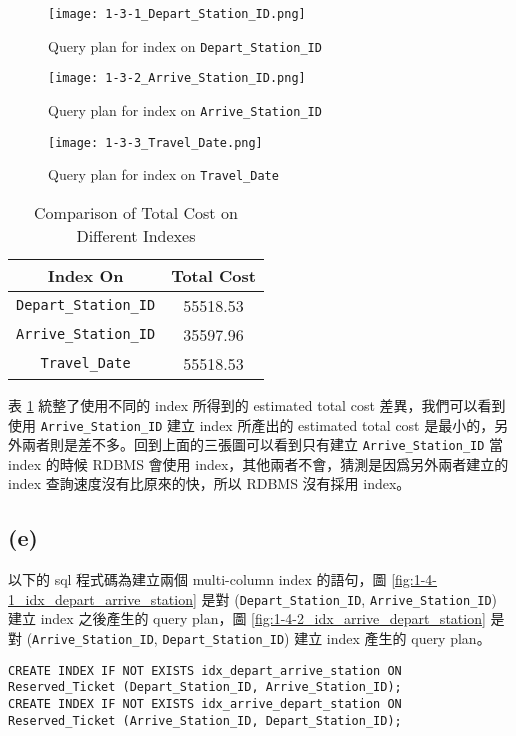 \documentclass{article}
\begin{document}
\begin{figure}[H]
    \centering
    \texttt{[image: 1-3-1\_Depart\_Station\_ID.png]}
    \caption{Query plan for index on \texttt{Depart\_Station\_ID}}
    \label{fig:1-3-1_Depart_Station_ID}
\end{figure}

\begin{figure}[H]
    \centering
    \texttt{[image: 1-3-2\_Arrive\_Station\_ID.png]}
    \caption{Query plan for index on \texttt{Arrive\_Station\_ID}}
    \label{fig:1-3-2_Arrive_Station_ID}
\end{figure}

\begin{figure}[H]
    \centering
    \texttt{[image: 1-3-3\_Travel\_Date.png]}
    \caption{Query plan for index on \texttt{Travel\_Date}}
    \label{fig:1-3-3_Travel_Date}
\end{figure}

\begin{table}[H]
    \centering
    \begin{tabular}{cc}
        \toprule
        \textbf{Index On} & \textbf{Total Cost} \\
        \midrule
        \texttt{Depart\_Station\_ID} & 55518.53 \\
        \texttt{Arrive\_Station\_ID} & 35597.96 \\
        \texttt{Travel\_Date} & 55518.53 \\
        \bottomrule
    \end{tabular}
    \caption{Comparison of Total Cost on Different Indexes}
    \label{tab:index-comparison}
\end{table}

表 \ref{tab:index-comparison} 統整了使用不同的 index 所得到的 estimated total cost 差異，我們可以看到使用 \texttt{Arrive\_Station\_ID} 建立 index 所產出的 estimated total cost 是最小的，另外兩者則是差不多。回到上面的三張圖可以看到只有建立 \texttt{Arrive\_Station\_ID} 當 index 的時候 RDBMS 會使用 index，其他兩者不會，猜測是因爲另外兩者建立的 index 查詢速度沒有比原來的快，所以 RDBMS 沒有採用 index。


\subsection*{(e)}
以下的 sql 程式碼為建立兩個 multi-column index 的語句，圖 \ref{fig:1-4-1_idx_depart_arrive_station} 是對 (\texttt{Depart\_Station\_ID}, \texttt{Arrive\_Station\_ID}) 建立 index 之後產生的 query plan，圖 \ref{fig:1-4-2_idx_arrive_depart_station} 是對 (\texttt{Arrive\_Station\_ID}, \texttt{Depart\_Station\_ID}) 建立 index 產生的 query plan。
\begin{verbatim}
CREATE INDEX IF NOT EXISTS idx_depart_arrive_station ON Reserved_Ticket (Depart_Station_ID, Arrive_Station_ID);
CREATE INDEX IF NOT EXISTS idx_arrive_depart_station ON Reserved_Ticket (Arrive_Station_ID, Depart_Station_ID);
\end{verbatim}
\end{document}
